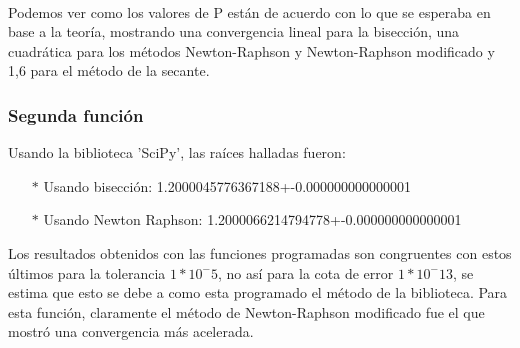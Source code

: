 \documentclass[titlepage,a4paper]{article}
\begin{document}
\\Podemos ver como los valores de P están de acuerdo con lo que se esperaba en base a la teoría, mostrando una convergencia lineal para la bisección, una cuadrática para los métodos Newton-Raphson y Newton-Raphson modificado y 1,6 para el método de la secante.
\subsubsection{Segunda función}\label{sec:CR2}

Usando la biblioteca 'SciPy', las raíces halladas fueron:
\begin{itemize}
    \item[$*$]Usando bisección:   1.2000045776367188+-0.000000000000001
    \item[$*$]Usando Newton Raphson:  1.2000066214794778+-0.000000000000001
\end{itemize}

Los resultados obtenidos con las funciones programadas son congruentes con estos últimos para la tolerancia $1*10^-5$, no así para la cota de error $1*10^-13$, se estima que esto se debe a como esta programado el método de la biblioteca. Para esta función, claramente el método de Newton-Raphson modificado fue el que mostró una convergencia más acelerada. 
\end{document}
